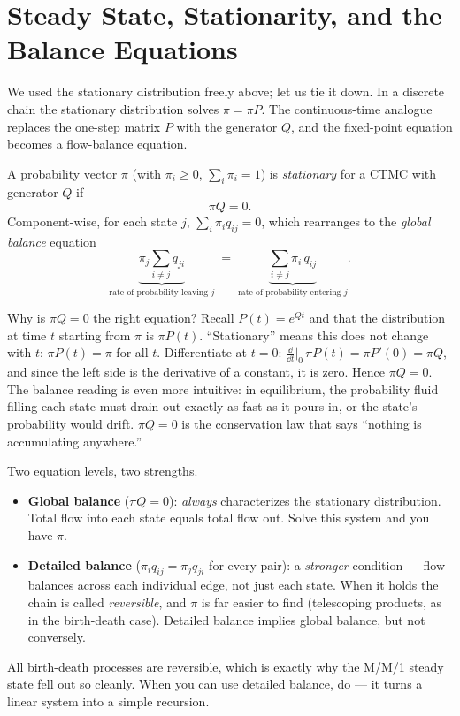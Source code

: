 \section{Steady State, Stationarity, and the Balance Equations}
\label{ch27:steady}

We used the stationary distribution freely above; let us tie it down. In a discrete chain the
stationary distribution solves $\pi = \pi P$. The continuous-time analogue replaces the
one-step matrix $P$ with the generator $Q$, and the fixed-point equation becomes a flow-balance
equation.

\begin{definition}
\label{ch27:def-stationary}
A probability vector $\pi$ (with $\pi_i \ge 0$, $\sum_i \pi_i = 1$) is \emph{stationary} for a CTMC
with generator $Q$ if
\[
  \boxed{\,\pi Q = 0.\,}
\]
Component-wise, for each state $j$, $\sum_{i} \pi_i q_{ij} = 0$, which rearranges to the
\emph{global balance} equation
\[
  \underbrace{\pi_j \sum_{i \ne j} q_{ji}}_{\text{rate of probability leaving } j}
  \;=\;
  \underbrace{\sum_{i \ne j} \pi_i\, q_{ij}}_{\text{rate of probability entering } j}.
\]
\end{definition}

\begin{whybox}
Why is $\pi Q = 0$ the right equation? Recall $P(t) = e^{Qt}$ and that the distribution at time $t$
starting from $\pi$ is $\pi P(t)$. ``Stationary'' means this does not change with $t$: $\pi P(t) =
\pi$ for all $t$. Differentiate at $t = 0$: $\frac{\dd}{\dd t}\big|_{0}\,\pi P(t) = \pi P'(0) = \pi
Q$, and since the left side is the derivative of a constant, it is zero. Hence $\pi Q = 0$. The
balance reading is even more intuitive: in equilibrium, the probability fluid filling each state
must drain out exactly as fast as it pours in, or the state's probability would drift. $\pi Q = 0$ is
the conservation law that says ``nothing is accumulating anywhere.''
\end{whybox}

\begin{focusbox}
Two equation levels, two strengths.
\begin{itemize}
  \item \textbf{Global balance} ($\pi Q = 0$): \emph{always} characterizes the stationary
  distribution. Total flow into each state equals total flow out. Solve this system and you have
  $\pi$.
  \item \textbf{Detailed balance} ($\pi_i q_{ij} = \pi_j q_{ji}$ for every pair): a \emph{stronger}
  condition --- flow balances across each individual edge, not just each state. When it holds the
  chain is called \emph{reversible}, and $\pi$ is far easier to find (telescoping products, as in the
  birth-death case). Detailed balance implies global balance, but not conversely.
\end{itemize}
All birth-death processes are reversible, which is exactly why the M/M/1 steady state fell out so
cleanly. When you can use detailed balance, do --- it turns a linear system into a simple recursion.
\end{focusbox}


